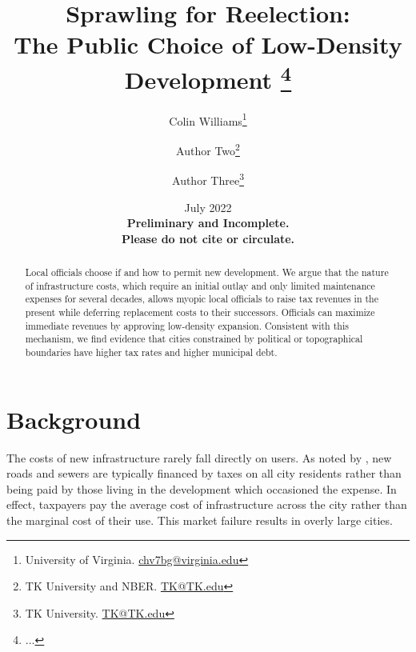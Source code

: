 \documentclass[12pt]{article}
\title{ \vspace*{-2.5cm} \hspace*{-0.5cm}Sprawling for Reelection: \\ The Public Choice of Low-Density Development \footnote{
...
}}
\author{Colin Williams\thanks{University of Virginia.
\href{mailto:chv7bg@virginia.edu}{chv7bg@virginia.edu}} \and Author Two\thanks{TK University and
NBER.  \href{mailto:TK@TK.edu}{TK@TK.edu}} \and Author Three\thanks{TK
University. \href{mailto:TK@TK.edu}{TK@TK.edu}}}
\date{ \vspace*{0.5cm} July 2022 \\
\textbf{Preliminary and Incomplete. \\ Please do not cite or circulate.}
}
\begin{document}
\bgroup
\let\footnoterule\relax

\begin{singlespace}
\maketitle


\begin{abstract}
    \noindent Local officials choose if and how to permit new development. We argue that the nature of infrastructure costs, which require an initial outlay and only limited maintenance expenses for several decades, allows myopic local officials to raise tax revenues in the present while deferring replacement costs to their successors. Officials can maximize immediate revenues by approving low-density expansion. Consistent with this mechanism, we find evidence that cities constrained by political or topographical boundaries have higher tax rates and higher municipal debt.
\end{abstract}
\end{singlespace}
\thispagestyle{empty}

\clearpage
\egroup
\setcounter{page}{1}



\noindent %


\section{Background \label{sec:background}}

The costs of new infrastructure rarely fall directly on users. As noted by \citet{brueckner2000urban}, new roads and sewers are typically financed by taxes on all city residents rather than being paid by those living in the development which occasioned the expense. In effect, taxpayers pay the average cost of infrastructure across the city rather than the marginal cost of their use. This market failure results in overly large cities.
\end{document}
